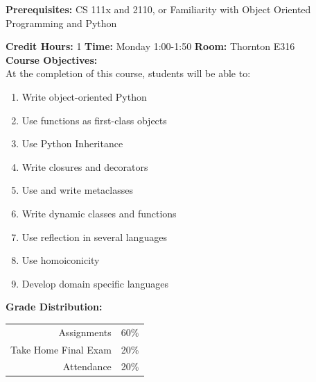 \documentclass[11pt]{article}
\begin{document}
\textbf {Prerequisites:}  
CS 111x and 2110, 
or Familiarity with Object Oriented Programming and Python

\textbf {Credit Hours:} 1 \hspace{5mm} \textbf{Time:} Monday 1:00-1:50 \hspace{5mm} \textbf{Room:} Thornton E316\\

\textbf {\large Course Objectives:} \\
At the completion of this course, students will be able to:
\begin{enumerate} \itemsep-0.4em
  \item Write object-oriented Python
  \item Use functions as first-class objects
  \item Use Python Inheritance  
  \item Write closures and decorators
  \item Use and write metaclasses  
  \item Write dynamic classes and functions 
  \item Use reflection in several languages
  \item Use homoiconicity
  \item Develop domain specific languages
\end{enumerate}

\textbf {\large Grade Distribution:} \\
\hspace*{40mm}
\begin{tabular}{ r l }
Assignments & 60\% \\
Take Home Final Exam  & 20\% \\
Attendance  & 20\%
\end{tabular} \\\\

\newpage
\end{document}

